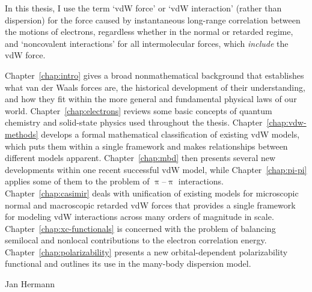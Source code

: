 
In this thesis, I use the term `vdW force' or `vdW interaction' (rather than dispersion) for the force caused by instantaneous long-range correlation between the motions of electrons, regardless whether in the normal or retarded regime, and `noncovalent interactions' for all intermolecular forces, which \emph{include} the vdW force.

Chapter~\ref{chap:intro} gives a broad nonmathematical background that establishes what van der Waals forces are, the historical development of their understanding, and how they fit within the more general and fundamental physical laws of our world.
Chapter~\ref{chap:electrons} reviews some basic concepts of quantum chemistry and solid-state physics used throughout the thesis.
Chapter~\ref{chap:vdw-methods} develops a formal mathematical classification of existing vdW models, which puts them within a single framework and makes relationships between different models apparent.
Chapter~\ref{chap:mbd} then presents several new developments within one recent successful vdW model, while Chapter~\ref{chap:pi-pi} applies some of them to the problem of $\uppi$--$\uppi$ interactions.
Chapter~\ref{chap:casimir} deals with unification of existing models for microscopic normal and macroscopic retarded vdW forces that provides a single framework for modeling vdW interactions across many orders of magnitude in scale.
Chapter~\ref{chap:xc-functionals} is concerned with the problem of balancing semilocal and nonlocal contributions to the electron correlation energy.
Chapter~\ref{chap:polarizability} presents a new orbital-dependent polarizability functional and outlines its use in the many-body dispersion model.

\begin{flushright}
Jan Hermann
\end{flushright}
